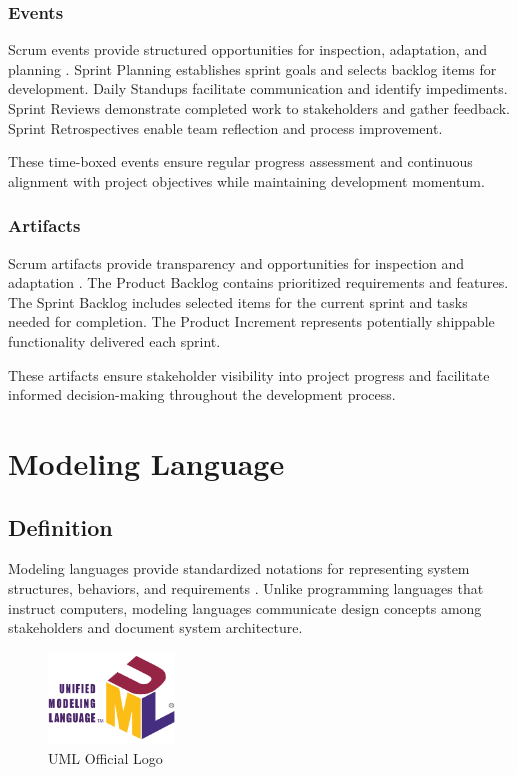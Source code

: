 \subsubsection{Events}

Scrum events provide structured opportunities for inspection, adaptation, and planning \cite{scrum_events}. Sprint Planning establishes sprint goals and selects backlog items for development. Daily Standups facilitate communication and identify impediments. Sprint Reviews demonstrate completed work to stakeholders and gather feedback. Sprint Retrospectives enable team reflection and process improvement.

These time-boxed events ensure regular progress assessment and continuous alignment with project objectives while maintaining development momentum.

\subsubsection{Artifacts}

Scrum artifacts provide transparency and opportunities for inspection and adaptation \cite{scrum_artifacts}. The Product Backlog contains prioritized requirements and features. The Sprint Backlog includes selected items for the current sprint and tasks needed for completion. The Product Increment represents potentially shippable functionality delivered each sprint.

These artifacts ensure stakeholder visibility into project progress and facilitate informed decision-making throughout the development process.

\section{Modeling Language}

\subsection{Definition}

Modeling languages provide standardized notations for representing system structures, behaviors, and requirements \cite{modeling_languages}. Unlike programming languages that instruct computers, modeling languages communicate design concepts among stakeholders and document system architecture.

\begin{figure}[htbp]
\centering
\includegraphics[width=0.3\textwidth]{pictures/web/UML_logo.svg.png}
\caption{UML Official Logo}
\label{fig:uml_logo}
\end{figure}

